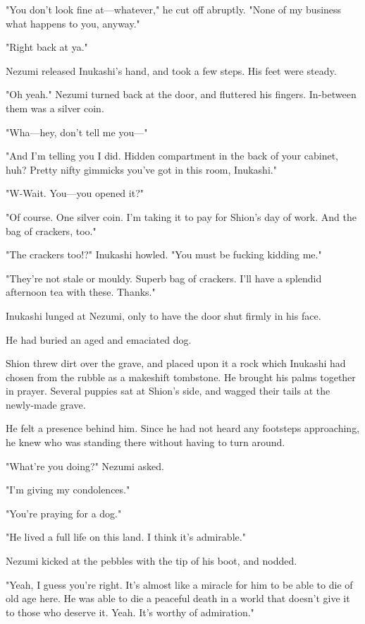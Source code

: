 "You don't look fine at---whatever," he cut off abruptly. "None of my
business what happens to you, anyway."

"Right back at ya."

Nezumi released Inukashi's hand, and took a few steps. His feet were
steady.

"Oh yeah." Nezumi turned back at the door, and fluttered his fingers.
In-between them was a silver coin.

"Wha---hey, don't tell me you---"

"And I'm telling you I did. Hidden compartment in the back of your
cabinet, huh? Pretty nifty gimmicks you've got in this room, Inukashi."

"W-Wait. You---you opened it?"

"Of course. One silver coin. I'm taking it to pay for Shion's day of
work. And the bag of crackers, too."

"The crackers too!?" Inukashi howled. "You must be fucking kidding me."

"They're not stale or mouldy. Superb bag of crackers. I'll have a
splendid afternoon tea with these. Thanks."

Inukashi lunged at Nezumi, only to have the door shut firmly in his
face.

\myspace

He had buried an aged and emaciated dog.

Shion threw dirt over the grave, and placed upon it a rock which
Inukashi had chosen from the rubble as a makeshift tombstone. He brought
his palms together in prayer. Several puppies sat at Shion's side, and
wagged their tails at the newly-made grave.

He felt a presence behind him. Since he had not heard any footsteps
approaching, he knew who was standing there without having to turn
around.

"What're you doing?" Nezumi asked.

"I'm giving my condolences."

"You're praying for a dog."

"He lived a full life on this land. I think it's admirable."

Nezumi kicked at the pebbles with the tip of his boot, and nodded.

"Yeah, I guess you're right. It's almost like a miracle for him to be
able to die of old age here. He was able to die a peaceful death in a
world that doesn't give it to those who deserve it. Yeah. It's worthy of
admiration."

